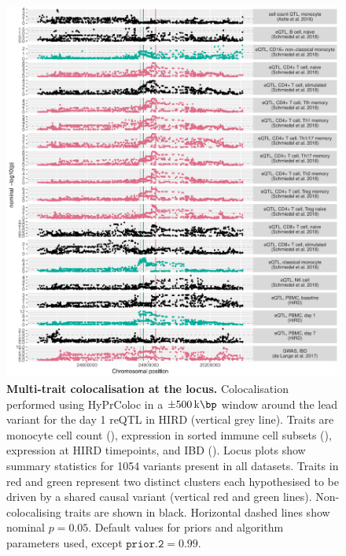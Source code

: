 \begin{figure}
    \centering
    \includegraphics[width=1.0\textwidth,page=1]{mainmatter/figures/chapter_03/perform_coloc.gene_ENSG00000138031.locusPlot.pdf}
    \caption[
    ]{
        \textbf{Multi-trait colocalisation at the  locus.}
        Colocalisation performed using {HyPrColoc} \autocite{foley2019FastEfficientColocalization} in a $\pm \SI{500}{\kilo\bp}$ window around the lead variant for the day 1  \gls{reQTL} in \gls{HIRD} (vertical grey line).
        Traits are monocyte cell count (\textcite{astle2016AllelicLandscapeHuman}),  expression in sorted immune cell subsets (\textcite{schmiedel2018ImpactGeneticPolymorphisms}),  expression at \gls{HIRD} timepoints, and \gls{IBD} (\textcite{delange2017GenomewideAssociationStudy}).
        Locus plots show summary statistics for 1054 variants present in all datasets.
        Traits in red and green represent two distinct clusters each hypothesised to be driven by a shared causal variant (vertical red and green lines).
        Non-colocalising traits are shown in black.
        Horizontal dashed lines show nominal $p = 0.05$.
        Default values for priors and algorithm parameters used, except $\texttt{prior.2} = 0.99$.
    }
    \label{fig:hird_reQTL_coloc_ADCY3_locusPlot}
\end{figure}

